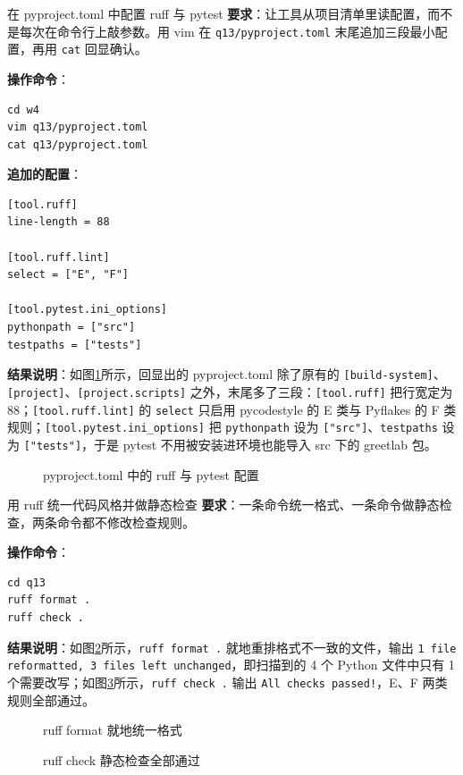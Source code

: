\begin{exercise}{在 pyproject.toml 中配置 ruff 与 pytest}
\textbf{要求}：让工具从项目清单里读配置，而不是每次在命令行上敲参数。用 vim 在 \verb|q13/pyproject.toml| 末尾追加三段最小配置，再用 \verb|cat| 回显确认。

\textbf{操作命令}：
\begin{lstlisting}
cd w4
vim q13/pyproject.toml
cat q13/pyproject.toml
\end{lstlisting}

\textbf{追加的配置}：
\begin{lstlisting}
[tool.ruff]
line-length = 88

[tool.ruff.lint]
select = ["E", "F"]

[tool.pytest.ini_options]
pythonpath = ["src"]
testpaths = ["tests"]
\end{lstlisting}

\textbf{结果说明}：如图\ref{fig:ms4-02}所示，回显出的 pyproject.toml 除了原有的 \verb|[build-system]|、\verb|[project]|、\verb|[project.scripts]| 之外，末尾多了三段：\verb|[tool.ruff]| 把行宽定为 88；\verb|[tool.ruff.lint]| 的 \verb|select| 只启用 pycodestyle 的 E 类与 Pyflakes 的 F 类规则；\verb|[tool.pytest.ini_options]| 把 \verb|pythonpath| 设为 \texttt{["src"]}、\verb|testpaths| 设为 \texttt{["tests"]}，于是 pytest 不用被安装进环境也能导入 src 下的 greetlab 包。

\begin{figure}[H]
    \centering
    \caption{pyproject.toml 中的 ruff 与 pytest 配置}
    \label{fig:ms4-02}
\end{figure}
\end{exercise}

\begin{exercise}{用 ruff 统一代码风格并做静态检查}
\textbf{要求}：一条命令统一格式、一条命令做静态检查，两条命令都不修改检查规则。

\textbf{操作命令}：
\begin{lstlisting}
cd q13
ruff format .
ruff check .
\end{lstlisting}

\textbf{结果说明}：如图\ref{fig:ms4-03a}所示，\verb|ruff format .| 就地重排格式不一致的文件，输出 \texttt{1 file reformatted, 3 files left unchanged}，即扫描到的 4 个 Python 文件中只有 1 个需要改写；如图\ref{fig:ms4-03b}所示，\verb|ruff check .| 输出 \texttt{All checks passed!}，E、F 两类规则全部通过。

\begin{figure}[H]
    \centering
    \caption{ruff format 就地统一格式}
    \label{fig:ms4-03a}
\end{figure}

\begin{figure}[H]
    \centering
    \caption{ruff check 静态检查全部通过}
    \label{fig:ms4-03b}
\end{figure}
\end{exercise}

